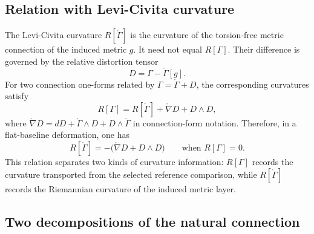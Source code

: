 \documentclass[12pt]{amsart}
\theoremstyle{definition}
\theoremstyle{remark}
\begin{document}
\subsection{Relation with Levi-Civita curvature}\label{subsec:lc_curvature_relation}

The Levi-Civita curvature \(R[\mathring\Gamma]\) is the curvature of the torsion-free metric connection of the induced metric \(g\).  It need not equal \(R[\Gamma]\).  Their difference is governed by the relative distortion tensor
\[
 D=\Gamma-\mathring\Gamma[g].
\]
For two connection one-forms related by \(\Gamma=\mathring\Gamma+D\), the corresponding curvatures satisfy
\begin{equation}\label{eq:curvature_difference_distortion}
 R[\Gamma]=R[\mathring\Gamma]+\mathring\nabla D+D\wedge D,
\end{equation}
where \(\mathring\nabla D=dD+\mathring\Gamma\wedge D+D\wedge\mathring\Gamma\) in connection-form notation.  Therefore, in a flat-baseline deformation, one has
\begin{equation}\label{eq:lc_curvature_from_distortion}
 R[\mathring\Gamma]=-\bigl(\mathring\nabla D+D\wedge D\bigr)
 \qquad\text{when }R[\Gamma]=0.
\end{equation}
This relation separates two kinds of curvature information: \(R[\Gamma]\) records the curvature transported from the selected reference comparison, while \(R[\mathring\Gamma]\) records the Riemannian curvature of the induced metric layer.

\subsection{Two decompositions of the natural connection}\label{subsec:lambda_split}
\end{document}
